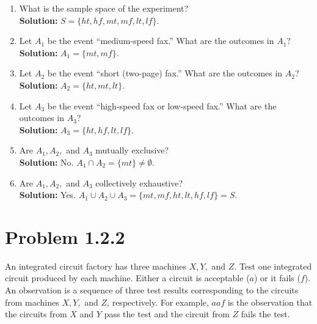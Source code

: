 \documentclass{article}
\begin{document}
\begin{enumerate}[label=(\alph*)]
    \item What is the sample space of the experiment? \\
    \textbf{Solution:} $S = \{ht, hf, mt, mf, lt, lf\}$.
    \item Let $A_1$ be the event ``medium-speed fax.'' What are the outcomes in $A_1$? \\
    \textbf{Solution:} $A_1 = \{mt, mf\}$.
    \item Let $A_2$ be the event ``short (two-page) fax.'' What are the outcomes in $A_2$? \\
    \textbf{Solution:} $A_2 = \{ht, mt, lt\}$.
    \item Let $A_3$ be the event ``high-speed fax or low-speed fax.'' What are the outcomes in $A_3$? \\
    \textbf{Solution:} $A_3 = \{ht, hf, lt, lf\}$.
    \item Are $A_1, A_2,$ and $A_3$ mutually exclusive? \\
    \textbf{Solution:} No. $A_1 \cap A_2 = \{mt\} \neq \emptyset$.
    \item Are $A_1, A_2,$ and $A_3$ collectively exhaustive? \\
    \textbf{Solution:} Yes. $A_1 \cup A_2 \cup A_3 = \{mt, mf, ht, lt, hf, lf\} = S$.
\end{enumerate}

\newpage

\section*{Problem 1.2.2}
An integrated circuit factory has three machines $X, Y,$ and $Z$. Test one integrated circuit produced by each machine. Either a circuit is acceptable ($a$) or it fails ($f$). An observation is a sequence of three test results corresponding to the circuits from machines $X, Y,$ and $Z$, respectively. For example, $aaf$ is the observation that the circuits from $X$ and $Y$ pass the test and the circuit from $Z$ fails the test.
\end{document}
